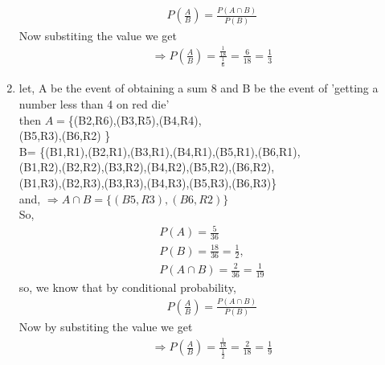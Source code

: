 \documentclass[10pt,twocolumn]{IEEEtran}
\begin{document}
\begin{enumerate}[label=(\roman*)]
          \begin{align*}
              P\left(\frac{A}{B}\right) =\frac{P(A\cap B)}{P(B)}
          \end{align*}
          Now substiting the value we get
          \begin{align}
              \Rightarrow P\left(\frac{A}{B}\right)=\frac{\frac{1}{18}}{\frac{1}{6}}=\frac{6}{18}=\frac{1}{3}
          \end{align}
    \item let, A be the event of
          obtaining a sum 8
          and B be the event of 'getting a number less than 4 on red die'\\
          then $ A=$\{(B2,R6),(B3,R5),(B4,R4),\\(B5,R3),(B6,R2) \}\\
          B= \{(B1,R1),(B2,R1),(B3,R1),(B4,R1),(B5,R1),(B6,R1),\\
          (B1,R2),(B2,R2),(B3,R2),(B4,R2),(B5,R2),(B6,R2),\\
          (B1,R3),(B2,R3),(B3,R3),(B4,R3),(B5,R3),(B6,R3)\}\\
          and,
          $\Rightarrow A\cap B = \{ (B5,R3),(B6,R2)\} $\\
          So,
          \begin{align}
              P(A)=\frac{5}{36}                          \\
              P(B)=\frac{18}{36}=\frac{1}{2},            \\
              P(A\cap B)=\frac{2}{36}=\frac{1}{19}
          \end{align}
          so,
          we know that by conditional probability,
          \begin{align*}
              P\left(\frac{A}{B}\right)=\frac{P(A\cap B)}{P(B)}
          \end{align*}
          Now by substiting the value we get
          \begin{align}
              \Rightarrow P\left(\frac{A}{B}\right)=\frac{\frac{1}{18}}{\frac{1}{2}}=\frac{2}{18}=\frac{1}{9}
          \end{align}

\end{enumerate}
\end{document}

